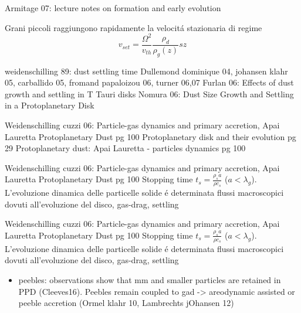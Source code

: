 \begin{workout}
	Armitage 07: lecture notes on formation and early evolution
\end{workout}

\begin{workout}	
	Grani piccoli raggiungono rapidamente la velocit\'a stazionaria di regime
	\begin{equation}
	v_{set}=\frac{\Omega^2}{v_{th}}\frac{\rho_d}{\rho_g(z)}sz
	\end{equation}
\end{workout}

\begin{workout}
	weidenschilling 89: dust settling time
	Dullemond dominique 04, johansen klahr 05, carballido 05, fromand papaloizou 06, turner 06,07
	Furlan 06: Effects of dust growth and settling in T Tauri disks
	Nomura 06: Dust Size Growth and Settling in a Protoplanetary Disk
	\cite{lissauer1993planet}
\end{workout}

\begin{workout}
	Weidenschilling cuzzi 06: Particle-gas dynamics and primary accretion, Apai Lauretta Protoplanetary Dust pg 100
	Protoplanetary disk and their evolution pg 29
	Protoplanetary dust: Apai Lauretta - particles dynamics pg 100
\end{workout}

\begin{workout}
	Weidenschilling cuzzi 06: Particle-gas dynamics and primary accretion, Apai Lauretta Protoplanetary Dust pg 100
	Stopping time $t_s=\frac{\rho_sa}{\rho c_s}$ ($a<\lambda_g$). L'evoluzione dinamica delle particelle solide \'e determinata flussi macroscopici dovuti all'evoluzione del disco, gas-drag, settling
\end{workout}

\begin{workout}
	Weidenschilling cuzzi 06: Particle-gas dynamics and primary accretion, Apai Lauretta Protoplanetary Dust pg 100
	Stopping time $t_s=\frac{\rho_sa}{\rho c_s}$ ($a<\lambda_g$). L'evoluzione dinamica delle particelle solide \'e determinata flussi macroscopici dovuti all'evoluzione del disco, gas-drag, settling
\end{workout}

\begin{workout}
	\begin{itemize}
		\item peebles: observations show that mm and smaller particles are retained in PPD (Cleeves16). Peebles remain coupled to gad -> areodynamic assisted or peeble accretion (Ormel klahr 10, Lambrechts jOhansen 12)
	\end{itemize}
\end{workout}

